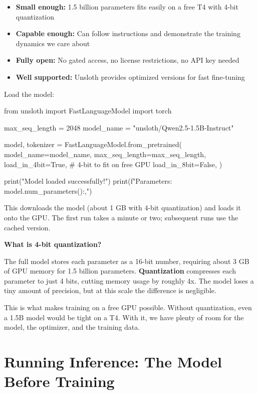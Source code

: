 \begin{chapterenv}
\begin{itemize}[nosep]
    \item \textbf{Small enough:} 1.5 billion parameters fits easily on a free T4 with 4-bit quantization
    \item \textbf{Capable enough:} Can follow instructions and demonstrate the training dynamics we care about
    \item \textbf{Fully open:} No gated access, no license restrictions, no API key needed
    \item \textbf{Well supported:} Unsloth provides optimized versions for fast fine-tuning
\end{itemize}

Load the model:

\begin{codeblock}[python]
from unsloth import FastLanguageModel
import torch

max_seq_length = 2048
model_name = "unsloth/Qwen2.5-1.5B-Instruct"

model, tokenizer = FastLanguageModel.from_pretrained(
    model_name=model_name,
    max_seq_length=max_seq_length,
    load_in_4bit=True,   # 4-bit to fit on free GPU
    load_in_8bit=False,
)

print("Model loaded successfully!")
print(f"Parameters: {model.num_parameters():,}")
\end{codeblock}

This downloads the model (about 1 GB with 4-bit quantization) and loads it onto the GPU. The first run takes a minute or two; subsequent runs use the cached version.

\begin{infobox}
\textbf{What is 4-bit quantization?}

The full model stores each parameter as a 16-bit number, requiring about 3 GB of GPU memory for 1.5 billion parameters. \textbf{Quantization} compresses each parameter to just 4 bits, cutting memory usage by roughly 4x. The model loses a tiny amount of precision, but at this scale the difference is negligible.

This is what makes training on a free GPU possible. Without quantization, even a 1.5B model would be tight on a T4. With it, we have plenty of room for the model, the optimizer, and the training data.
\end{infobox}

\section{Running Inference: The Model Before Training}


\end{chapterenv}
